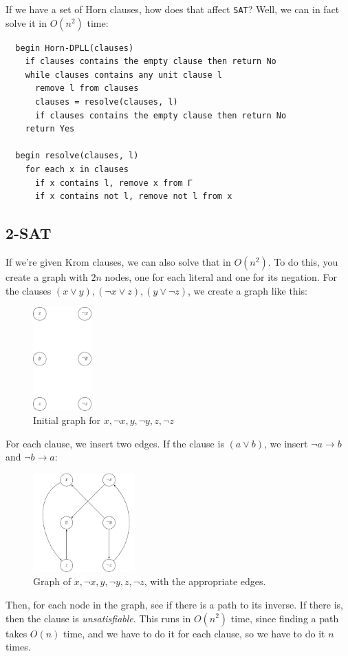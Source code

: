If we have a set of Horn clauses, how does that affect \texttt{SAT}? Well, we
can in fact solve it in $O(n^2)$ time:

\begin{verbatim}
  begin Horn-DPLL(clauses)
    if clauses contains the empty clause then return No
    while clauses contains any unit clause l
      remove l from clauses
      clauses = resolve(clauses, l)
      if clauses contains the empty clause then return No
    return Yes

  begin resolve(clauses, l)
    for each x in clauses
      if x contains l, remove x from Γ
      if x contains not l, remove not l from x
\end{verbatim}

\subsection{2-SAT}

If we're given Krom clauses, we can also solve that in $O(n^2)$. To do this, you
create a graph with $2n$ nodes, one for each literal and one for its negation.
For the clauses $(x \vee y), (\neg x \vee z), (y \vee \neg z)$, we create a
graph like this:

\begin{figure}[H]
  \centering
  \includegraphics[width=0.2\textwidth]{diagrams/graph9}
  \caption{Initial graph for $x, \neg x, y, \neg y, z, \neg z$}
  \label{fig:graph-9}
\end{figure}

For each clause, we insert two edges. If the clause is $(a \vee b)$, we insert
$\neg a \rightarrow b$ and $\neg b \rightarrow a$:

\begin{figure}[H]
  \centering
  \includegraphics[width=0.35\textwidth]{diagrams/graph10}
  \caption{Graph of $x, \neg x, y, \neg y, z, \neg z$, with the appropriate
  edges.}
  \label{fig:graph-10}
\end{figure}

Then, for each node in the graph, see if there is a path to its inverse. If
there is, then the clause is \textit{unsatisfiable}. This runs in $O(n^2)$ time,
since finding a path takes $O(n)$ time, and we have to do it for each clause, so
we have to do it $n$ times.
